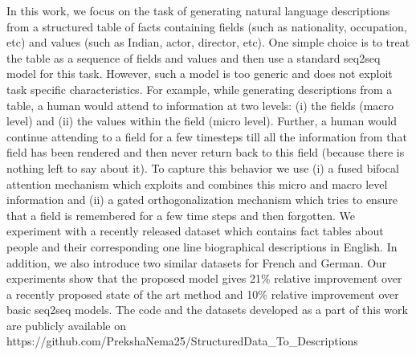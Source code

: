 In this work, we focus on the task of generating natural language descriptions from a structured table of facts containing fields (such as nationality, occupation, etc) and values (such as Indian, {actor, director}, etc). One simple choice is to treat the table as a sequence of fields and values and then use a standard seq2seq model for this task. However, such a model is too generic and does not exploit task specific characteristics. For example, while generating descriptions from a table, a human would attend to information at two levels: (i) the fields (macro level) and (ii) the values within the field (micro level). Further, a human would continue attending to a field for a few timesteps till all the information from that field has been rendered and then never return back to this field (because there is nothing left to say about it). To capture this behavior we use (i) a fused bifocal attention mechanism which exploits and combines this micro and macro level information and (ii) a gated orthogonalization mechanism which tries to ensure that a field is remembered for a few time steps and then forgotten.  We experiment with a recently released dataset which contains fact tables about people and their corresponding one line biographical descriptions in English. In addition, we also introduce two similar datasets for French and German. Our experiments show that the proposed model gives 21\% relative improvement over a recently proposed state of the art method and 10\% relative improvement over basic seq2seq models. The code and the datasets developed as a part of this work are publicly available on https://github.com/PrekshaNema25/StructuredData\_To\_Descriptions
